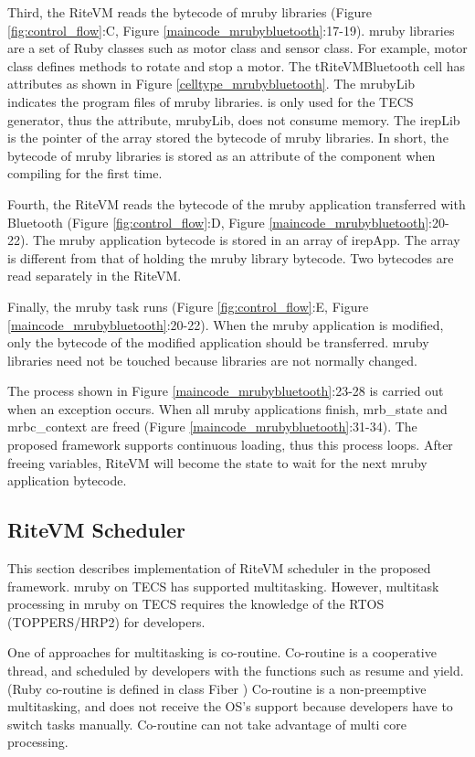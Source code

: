 \documentclass{sig-alternate-05-2015}
\begin{document}
Third, the RiteVM reads the bytecode of mruby libraries (Figure \ref{fig:control_flow}:C, Figure \ref{maincode_mrubybluetooth}:17-19).
mruby libraries are a set of Ruby classes such as motor class and sensor class.
For example, motor class defines methods to rotate and stop a motor.
The tRiteVMBluetooth {\myit cell} has attributes as shown in Figure \ref{celltype_mrubybluetooth}.
The {\myit mrubyLib} indicates the program files of mruby libraries.
{\myit [omit]} is only used for the TECS generator, thus the attribute, {\myit mrubyLib}, does not consume memory.
The {\myit irepLib} is the pointer of the array stored the bytecode of mruby libraries.
In short, the bytecode of mruby libraries is stored as an attribute of the component when compiling for the first time.


Fourth, the RiteVM reads the bytecode of the mruby application transferred with Bluetooth (Figure \ref{fig:control_flow}:D, Figure \ref{maincode_mrubybluetooth}:20-22).
The mruby application bytecode is stored in an array of {\myit irepApp}.
The array is different from that of holding the mruby library bytecode.
Two bytecodes are read separately in the RiteVM.

Finally, the mruby task runs (Figure \ref{fig:control_flow}:E, Figure \ref{maincode_mrubybluetooth}:20-22).
When the mruby application is modified, only the bytecode of the modified application should be transferred.
mruby libraries need not be touched because libraries are not normally changed.

The process shown in Figure \ref{maincode_mrubybluetooth}:23-28 is carried out when an exception occurs.
When all mruby applications finish, mrb\_state and mrbc\_context are freed (Figure \ref{maincode_mrubybluetooth}:31-34).
The proposed framework supports continuous loading, thus this process loops.
After freeing variables, RiteVM will become the state to wait for the next mruby application bytecode.
\subsection{RiteVM Scheduler}
\label{sec:RiteVM Scheduler}
This section describes implementation of RiteVM scheduler in the proposed framework.
mruby on TECS has supported multitasking.
However, multitask processing in mruby on TECS requires the knowledge of the RTOS (TOPPERS/HRP2) for developers.

One of approaches for multitasking is co-routine.
Co-routine is a cooperative thread, and scheduled by developers with the functions such as {\myit resume} and {\myit yield}. 
(Ruby co-routine is defined in class Fiber \cite{url:co-routine})
Co-routine is a non-preemptive multitasking, and does not receive the OS's support because developers have to switch tasks manually.
Co-routine can not take advantage of multi core processing.
\end{document}
